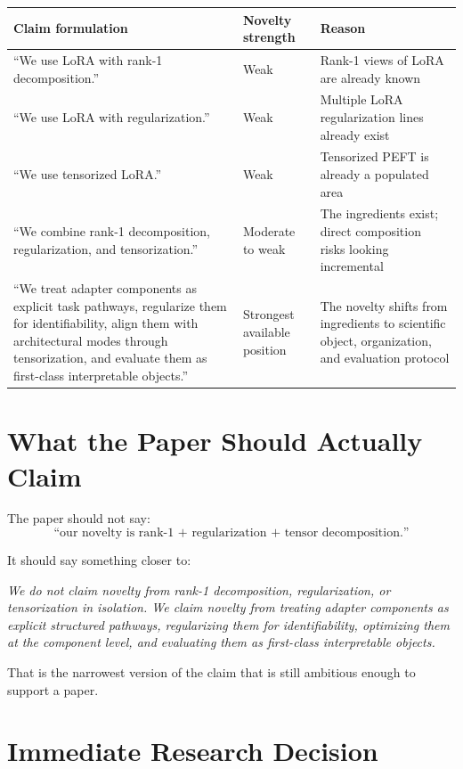 \documentclass[11pt]{article}
\begin{document}
\begin{center}
\renewcommand{\arraystretch}{1.25}
\begin{tabular}{|>{\raggedright\arraybackslash}p{4.4cm}|>{\raggedright\arraybackslash}p{3.3cm}|>{\raggedright\arraybackslash}p{4.8cm}|}
\hline
\textbf{Claim formulation} & \textbf{Novelty strength} & \textbf{Reason} \\
\hline
``We use LoRA with rank-1 decomposition.'' & Weak & Rank-1 views of LoRA are already known \\
\hline
``We use LoRA with regularization.'' & Weak & Multiple LoRA regularization lines already exist \\
\hline
``We use tensorized LoRA.'' & Weak & Tensorized PEFT is already a populated area \\
\hline
``We combine rank-1 decomposition, regularization, and tensorization.'' & Moderate to weak & The ingredients exist; direct composition risks looking incremental \\
\hline
``We treat adapter components as explicit task pathways, regularize them for identifiability, align them with architectural modes through tensorization, and evaluate them as first-class interpretable objects.'' & Strongest available position & The novelty shifts from ingredients to scientific object, organization, and evaluation protocol \\
\hline
\end{tabular}
\end{center}

\section{What the Paper Should Actually Claim}

The paper should not say:
\[
\text{``our novelty is rank-1 + regularization + tensor decomposition.''}
\]

It should say something closer to:

\emph{We do not claim novelty from rank-1 decomposition, regularization, or tensorization in isolation. We claim novelty from treating adapter components as explicit structured pathways, regularizing them for identifiability, optimizing them at the component level, and evaluating them as first-class interpretable objects.}

That is the narrowest version of the claim that is still ambitious enough to support a paper.

\section{Immediate Research Decision}
\end{document}
